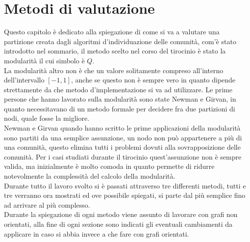 %
%
\chapter{Metodi di valutazione}
Questo capitolo è dedicato alla spiegazione di come si va a valutare una partizione creata dagli algoritmi d'individuazione delle comunità, com'è stato introdotto nel sommario, il metodo scelto nel corso del tirocinio è stato la modularità il cui simbolo è $Q$.\\
La modularità altro non è che un valore solitamente compreso all'interno dell'intervallo $[-1, 1]$, anche se questo non è sempre vero in quanto dipende strettamente da che metodo d'implementazione si va ad utilizzare. Le prime persone che hanno lavorato sulla modularità sono state Newman e Girvan, in quanto necessitavano di un metodo formale per decidere fra due partizioni di nodi, quale fosse la migliore.\\
Newman e Girvan quando hanno scritto le prime applicazioni della modularità sono partiti da una semplice assunzione, un nodo non può appartenere a più di una comunità, questo elimina tutti i problemi dovuti alla sovrapposizione delle comunità. Per i casi studiati durante il tirocinio quest'assunzione non è sempre valida, ma inizialmente è molto comoda in quanto permette di ridurre notevolmente la complessità del calcolo della modularità.\\
Durante tutto il lavoro svolto si è passati attraverso tre differenti metodi, tutti e tre verranno ora mostrati ed ove possibile spiegati, si parte dal più semplice fino ad arrivare al più complesso.\\ Durante la spiegazione di ogni metodo viene assunto di lavorare con grafi non orientati, alla fine di ogni sezione sono indicati gli eventuali cambiamenti da applicare in caso si abbia invece a che fare con grafi orientati.
%
